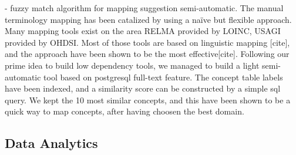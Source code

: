 - fuzzy match algorithm for mapping suggestion semi-automatic.
The manual terminology mapping has been catalized by using a naïve but flexible
approach. Many mapping tools exist on the area RELMA provided by LOINC, USAGI
provided by OHDSI. Most of those tools are based on linguistic mapping [cite],
and the approach have been shown to be the most effective[cite]. Following our
prime idea to build low dependency tools, we managed to build a light
semi-automatic tool based on postgresql full-text feature. The concept table
labels have been indexed, and a similarity score can be constructed by a simple
sql query. We kept the 10 most similar concepts, and this have been shown to be
a quick way to map concepts, after having choosen the best domain.
\subsection{Data Analytics}
